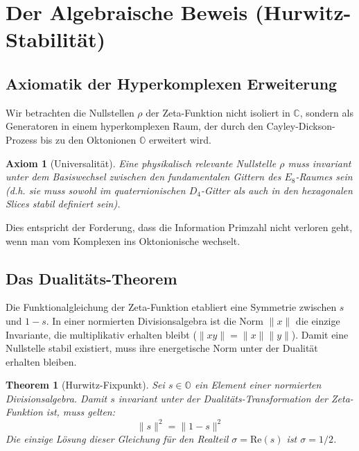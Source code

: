 \documentclass[11pt, a4paper]{article}
\newtheorem{theorem}{Theorem}
\newtheorem{axiom}{Axiom}
\begin{document}
	\section{Der Algebraische Beweis (Hurwitz-Stabilität)}
	
	\subsection{Axiomatik der Hyperkomplexen Erweiterung}
	Wir betrachten die Nullstellen $\rho$ der Zeta-Funktion nicht isoliert in $\mathbb{C}$, sondern als Generatoren in einem hyperkomplexen Raum, der durch den Cayley-Dickson-Prozess bis zu den Oktonionen $\mathbb{O}$ erweitert wird.
	
	\begin{axiom}[Universalität]
		Eine physikalisch relevante Nullstelle $\rho$ muss invariant unter dem Basiswechsel zwischen den fundamentalen Gittern des $E_8$-Raumes sein (d.h. sie muss sowohl im quaternionischen $D_4$-Gitter als auch in den hexagonalen Slices stabil definiert sein).
	\end{axiom}
	
	Dies entspricht der Forderung, dass die Information \glqq Primzahl\grqq{} nicht verloren geht, wenn man vom Komplexen ins Oktonionische wechselt.
	
	\subsection{Das Dualitäts-Theorem}
	Die Funktionalgleichung der Zeta-Funktion etabliert eine Symmetrie zwischen $s$ und $1-s$. In einer normierten Divisionsalgebra ist die Norm $\|x\|$ die einzige Invariante, die multiplikativ erhalten bleibt ($\|xy\| = \|x\|\|y\|$).
	Damit eine Nullstelle stabil existiert, muss ihre \glqq energetische\grqq{} Norm unter der Dualität erhalten bleiben.
	
	\begin{theorem}[Hurwitz-Fixpunkt]
		Sei $s \in \mathbb{O}$ ein Element einer normierten Divisionsalgebra. Damit $s$ invariant unter der Dualitäts-Transformation der Zeta-Funktion ist, muss gelten:
		\begin{equation}
			\|s\|^2 = \|1-s\|^2
		\end{equation}
		Die einzige Lösung dieser Gleichung für den Realteil $\sigma = \text{Re}(s)$ ist $\sigma = 1/2$.
	\end{theorem}
	
\end{document}
